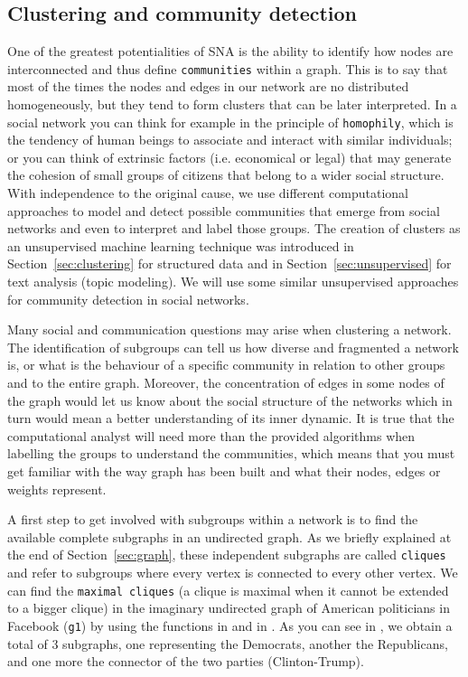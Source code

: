 
\subsection{Clustering and community detection}

One of the greatest potentialities of SNA is the ability to identify how nodes are interconnected and thus define \texttt{communities} within a graph. This is to say that most of the times the nodes and edges in our network are no distributed homogeneously, but they tend to form clusters that can be later interpreted. In a social network you can think for example in the principle of \texttt{homophily}, which is the tendency of human beings to associate and interact with similar individuals; or you can think of extrinsic factors (i.e. economical or legal) that may generate the cohesion of small groups of citizens that belong to a wider social structure. With independence to the original cause, we use different computational approaches to model and detect possible communities that emerge from social networks and even to interpret and label those groups. The creation of clusters as an unsupervised machine learning technique was introduced in Section~\ref{sec:clustering} for structured data and in Section~\ref{sec:unsupervised} for text analysis (topic modeling). We will use some similar unsupervised approaches for community detection in social networks.

Many social and communication questions may arise when clustering a network. The identification of subgroups can tell us how diverse and fragmented a network is, or  what is the behaviour of a specific community in relation to other groups and to the entire graph. Moreover, the concentration of edges in some nodes of the graph would let us know about the social structure of the networks which in turn would mean a better understanding of its inner dynamic.  It is true that the computational analyst will need more than the provided algorithms when labelling the groups to understand the communities, which means that you must get familiar with the way graph has been built and what their nodes, edges or weights represent.

A first step to get involved with subgroups within a network is to find the available complete subgraphs in an undirected graph. As we briefly explained at the end of Section~\ref{sec:graph}, these independent subgraphs are called \texttt{cliques} and refer to subgroups where every vertex is connected to every other vertex. We can find the \texttt{maximal cliques} (a clique is maximal when it cannot be extended to a  bigger clique) in the imaginary undirected graph of American politicians in Facebook (\texttt{g1}) by using the functions  in  \citep{eppstein2010listing} and  in  \citep{cazals2008note}. As you can see in , we obtain a total of 3 subgraphs, one representing the Democrats, another the Republicans, and one more the connector of the two parties (Clinton-Trump).

